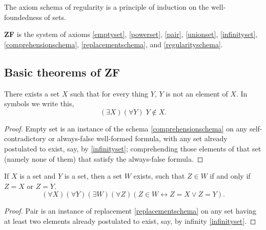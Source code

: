 \documentclass[letterpaper]{article}
\newcommand{\Axiom}{{\large\Bearing}}
\newcommand{\AxiomSchema}{{\large\LooseBearing}}
\begin{document}
\begin{remark}
	The axiom schema of regularity is a principle of induction on the well-foundedness of sets.
\end{remark}
\begin{definition}\label{def-zf}
	\textbf{ZF} is the system of axioms \Axiom\ref{emptyset}, \Axiom\ref{powerset}, \Axiom\ref{pair}, \Axiom\ref{unionset}, \Axiom\ref{infinityset}, \AxiomSchema\ref{comprehensionschema}, \AxiomSchema\ref{replacementschema}, and \AxiomSchema\ref{regularityschema}.
\end{definition}
\subsection{Basic theorems of \textbf{ZF}}
\begin{theorem}\label{emptyset}
	There exists a set $X$ such that for every thing $Y$, $Y$ is not an element of $X$.  In symbols we write this,
	\begin{equation}
	(\exists X)(\forall Y)\;Y\notin X.
	\end{equation}
\end{theorem}
\begin{proof}
	Empty set is an instance of the schema \AxiomSchema\ref{comprehensionschema} on any self-contradictory or always-false well-formed formula,
	with any set already postulated to exist, say, by \Axiom \ref{infinityset}; comprehending those elements of that set (namely none of them) that satisfy the always-false formula.
\end{proof}
\begin{theorem}[Pair]\label{pair}
	If $X$ is a set and $Y$ is a set, then a set $W$ exists, such that \mbox{$Z\in W$} if and only if \mbox{$Z=X$} or \mbox{$Z=Y$}.
	\begin{equation}\label{eq-pair}
	(\forall X)(\forall Y)(\exists W)(\forall Z)(Z\in W\longleftrightarrow Z=X\lor Z=Y).
	\end{equation}
\end{theorem}
\begin{proof}
	Pair is an instance of replacement \AxiomSchema\ref{replacementschema} on any set having at least two elements already postulated to exist, say, by infinity \Axiom\ref{infinityset}.
\end{proof}
\end{document}
